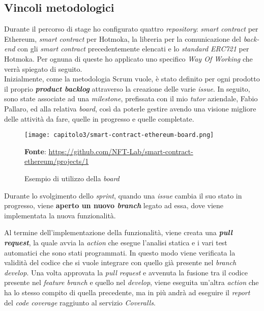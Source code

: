 
\subsection{Vincoli metodologici}
Durante il percorso di stage ho configurato quattro \textit{repository}: \textit{smart contract} per Ethereum, \textit{smart contract} per Hotmoka, la libreria per la comunicazione del \textit{back-end} con gli \textit{smart contract} precedentemente elencati e lo \textit{standard ERC721} per Hotmoka. Per ognuna di queste ho applicato uno specifico \textit{Way Of Working} che verrà spiegato di seguito. \\

Inizialmente, come la metodologia Scrum vuole, è stato definito per ogni prodotto il proprio \textbf{\textit{product backlog}} attraverso la creazione delle varie \textit{issue}. In seguito, sono state associate ad una \textit{milestone}, prefissata con il mio \textit{tutor} aziendale, Fabio Pallaro, ed alla relativa \textit{board}, così da poterle gestire avendo una visione migliore delle attività da fare, quelle in progresso e quelle completate.

\begin{figure}[h!]
  \centering
  \texttt{[image: capitolo3/smart-contract-ethereum-board.png]}
  \caption{Esempio di utilizzo della \textit{board}}
  \textbf{Fonte}: \href{https://github.com/NFT-Lab/smart-contract-ethereum/projects/1}{https://github.com/NFT-Lab/smart-contract-ethereum/projects/1}
\end{figure}

Durante lo svolgimento dello \textit{sprint}, quando una \textit{issue} cambia il suo stato in progresso, viene \textbf{aperto un nuovo \textit{branch}} legato ad essa, dove viene implementata la nuova funzionalità.

Al termine dell'implementazione della funzionalità, viene creata una \textbf{\textit{pull request}}, la quale avvia la \textit{action} che esegue l'analisi statica e i vari test automatici che sono stati programmati. In questo modo viene verificata la validità del codice che si vuole integrare con quello già presente nel \textit{branch develop}. Una volta approvata la \textit{pull request} e avvenuta la fusione tra il codice presente nel \textit{feature branch} e quello nel \textit{develop}, viene eseguita un'altra \textit{action} che ha lo stesso compito di quella precedente, ma in più andrà ad eseguire il \textit{report} del \textit{code coverage} raggiunto al servizio \textit{Coveralls}.

